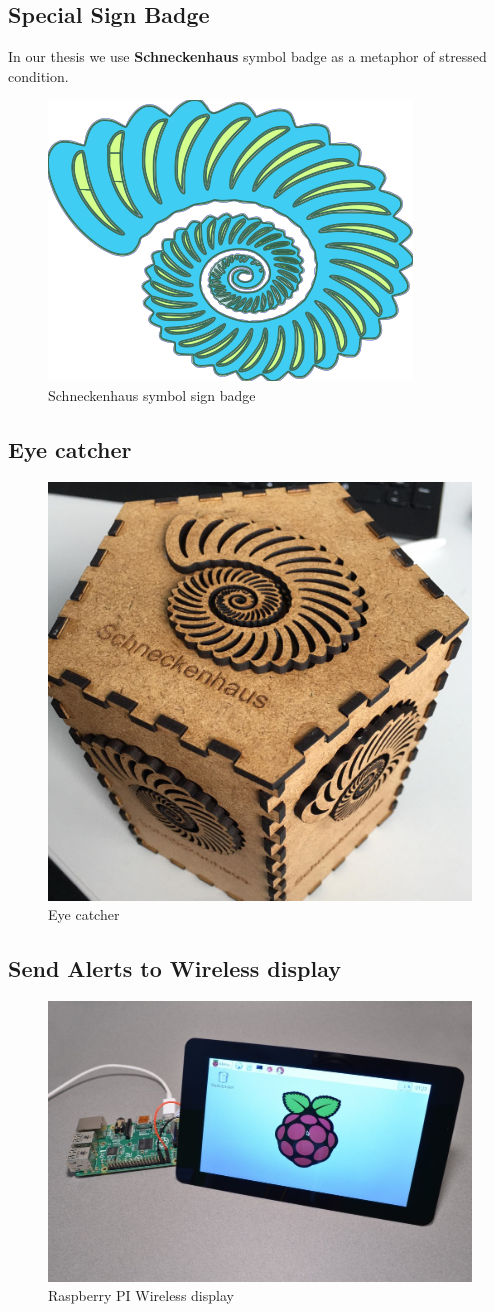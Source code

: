 \subsection{Special Sign Badge}
In our thesis we use \textbf{Schneckenhaus} symbol badge as a metaphor of stressed condition.
\begin{figure}[hbt!] 
  \centering
  \includegraphics[width=0.5\linewidth]{chap4/image4/logo1.png}
  \caption[Schneckenhaus symbol sign badge ]{Schneckenhaus symbol sign badge}
  \label{fig:Sign_badge}
\end{figure}
\subsection{Eye catcher}
\begin{figure}[hbt!] 
  \centering
  \includegraphics[width=0.5\linewidth]{chap4/image4/skn2.png}
  \caption[Eye catcher ]{Eye catcher}
  \label{fig:eye}
\end{figure}
\subsection{Send Alerts to Wireless display}
\begin{figure}[hbt!] 
  \centering
  \includegraphics[width=0.5\linewidth]{chap4/image4/dipl.jpg}
  \caption[Raspberry PI Wireless display ]{Raspberry PI Wireless display}
  \label{fig:PI_disp}
\end{figure}

